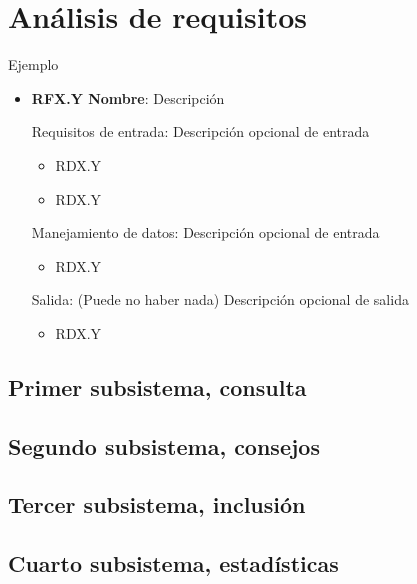 \documentclass[a4paper, 11pt]{article}
\begin{document}
\newpage
\section{Análisis de requisitos}

Ejemplo

\begin{itemize}
	\item \textbf{RFX.Y Nombre}: Descripción
	
	Requisitos de entrada: Descripción opcional de entrada
	\begin{itemize}
		\item RDX.Y
		\item RDX.Y
	\end{itemize}
	Manejamiento de datos: Descripción opcional de entrada
	\begin{itemize}
		\item RDX.Y
	\end{itemize}
	Salida: (Puede no haber nada) Descripción opcional de salida
	\begin{itemize}
		\item RDX.Y
	\end{itemize}
\end{itemize}


\subsection{Primer subsistema, consulta}


\subsection{Segundo subsistema, consejos}


\subsection{Tercer subsistema, inclusión}


\subsection{Cuarto subsistema, estadísticas}

	
\end{document}
